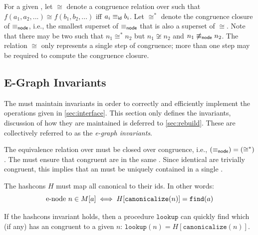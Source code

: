 \begin{definition}[Congruence]
  For a given \egraph, let $\cong$ denote a congruence relation over \enodes such that
  ${f(a_{1}, a_{2}, ...) \cong f(b_{1}, b_{2}, ...)}$ iff $a_{i} \equiv_{\sf id} b_{i}$.
  Let $\cong^{*}$ denote the congruence closure of $\equiv_{\sf node}$,
   i.e., the smallest superset of $\equiv_{\sf node}$ that is also a superset of $\cong$.
  Note that there may be two \enodes such that
    $n_{1} \cong^{*} n_{2}$ but
    $n_{1} \not\cong n_{2}$ and
    $n_{1} \not\equiv_{\sf node} n_{2}$.
  The relation $\cong$ only represents a single step of congruence;
  more than one step may be required to compute the congruence closure.
\end{definition}

\subsection{E-Graph Invariants}
\label{sec:invariants}

The \egraph must maintain invariants in order to
  correctly and efficiently implement the operations given in \autoref{sec:interface}.
This section only defines the invariants,
  discussion of how they are maintained is deferred to \autoref{sec:rebuild}.
These are collectively referred to as the \textit{e-graph invariants}.

\begin{definition}
  \label{def:cong-inv}
  The equivalence relation over \enodes must be closed over congruence,
    i.e., $(\equiv_{\sf node}) = (\cong^{*})$.
  The \egraph must ensure that congruent \enodes are in the same \eclass.
  Since identical \enodes are trivially congruent,
   this implies that an \enode must be uniquely contained in a single \eclass.
\end{definition}

\begin{definition}
  \label{def:hash-inv}
  The hashcons $H$ must map all canonical \enodes to their \eclass ids.
  In other words:
  $$ \mbox{e-node}\ n \in M[a] \iff H[\texttt{canonicalize}(n)] = \texttt{find}(a) $$

  If the hashcons invariant holds, then a procedure $\texttt{lookup}$
    can quickly find which \eclass (if any) has an \enode congruent to a given \enode $n$:
  $\texttt{lookup}(n) = H[\texttt{canonicalize}(n)]$.
\end{definition}

